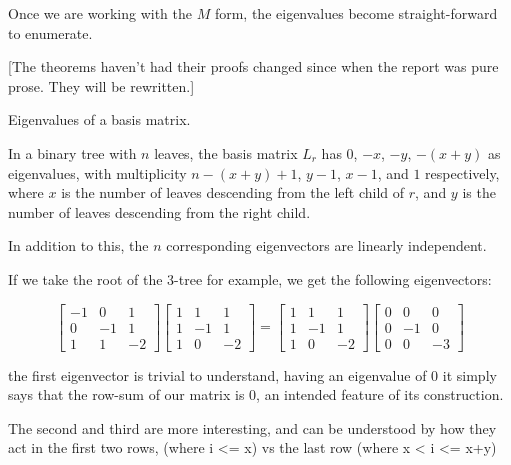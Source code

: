 \documentclass[10pt,a4paper]{report}
\begin{document}
Once we are working with the $M$ form, the eigenvalues become straight-forward to enumerate.

[The theorems haven't had their proofs changed since when the report was pure
prose. They will be rewritten.]

\begin{theorem-wip} Eigenvalues of a basis matrix.

	In a binary tree with $n$ leaves, the basis matrix $L_r$ has $0$, $-x$, $-y$, $-(x + y)$ as eigenvalues, with multiplicity $n-(x+y)+1$, $y-1$, $x-1$, and $1$ respectively, where $x$ is the number of leaves descending from the left child of $r$, and $y$ is the number of leaves descending from the right child.

	In addition to this, the $n$ corresponding eigenvectors are linearly independent.
\end{theorem-wip}


If we take the root of the 3-tree for example, we get the following
eigenvectors:

\begin{equation*}
\left[\begin{matrix}
	-1 & 0 & 1\\
	0 & -1 & 1\\
	1 & 1 & -2
\end{matrix}\right]
\left[\begin{matrix}
	1 & 1 & 1\\
	1 & -1 & 1\\
	1 & 0 & -2
\end{matrix}\right]
=
\left[\begin{matrix}
	1 & 1 & 1\\
	1 & -1 & 1\\
	1 & 0 & -2
\end{matrix}\right]
\left[\begin{matrix}
	0 & 0 & 0\\
	0 & -1 & 0\\
	0 & 0 & -3
\end{matrix}\right]
\end{equation*}

the first eigenvector is trivial to understand, having an eigenvalue of 0 it
simply says that the row-sum of our matrix is 0, an intended feature of its
construction.

The second and third are more interesting, and can be understood by how they
act in the first two rows, (where i <= x) vs the last row (where x < i <= x+y)
\end{document}
